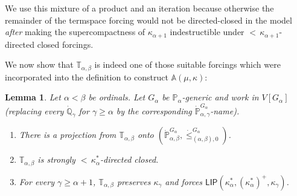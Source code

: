 \documentclass[a4paper]{amsart}
\theoremstyle{definition}
\theoremstyle{remark}
\theoremstyle{plain}
\newtheorem{mylem}[mydef]{Lemma}
\numberwithin{mydef}{section}
\newcommand{\dA}{\mathbb{A}}
\newcommand{\dP}{\mathbb{P}}
\newcommand{\dQ}{\mathbb{Q}}
\newcommand{\dT}{\mathbb{T}}
\newcommand{\LIP}{\mathsf{LIP}}
\begin{document}
	We use this mixture of a product and an iteration because otherwise the remainder of the termspace forcing would not be directed-closed in the model \emph{after} making the supercompactness of $\kappa_{\alpha+1}$ indestructible under ${<}\,\kappa_{\alpha+1}$-directed closed forcings.
	
	We now show that $\dT_{\alpha,\beta}$ is indeed one of those suitable forcings which were incorporated into the definition to construct $\dA(\mu,\kappa)$:
	
	\begin{mylem}\label{TProp}
		Let $\alpha<\beta$ be ordinals. Let $G_{\alpha}$ be $\dP_{\alpha}$-generic and work in $V[G_{\alpha}]$ (replacing every $\dot{\dQ}_{\gamma}$ for $\gamma\geq\alpha$ by the corresponding $\dot{\dP}_{\alpha,\gamma}^{G_{\alpha}}$-name).
		\begin{enumerate}
			\item There is a projection from $\dT_{\alpha,\beta}$ onto $(\dot{\dP}_{\alpha,\beta}^{G_{\alpha}},\dot{\leq}_{(\alpha,\beta),0}^{G_{\alpha}})$.
			\item $\dT_{\alpha,\beta}$ is strongly ${<}\,\kappa_{\alpha}^*$-directed closed.
			\item For every $\gamma\geq\alpha+1$, $\dT_{\alpha,\beta}$ preserves $\kappa_{\gamma}$ and forces $\LIP(\kappa_{\alpha}^*,(\kappa_{\alpha}^*)^+,\kappa_{\gamma})$.
		\end{enumerate}
	\end{mylem}
	
\end{document}
